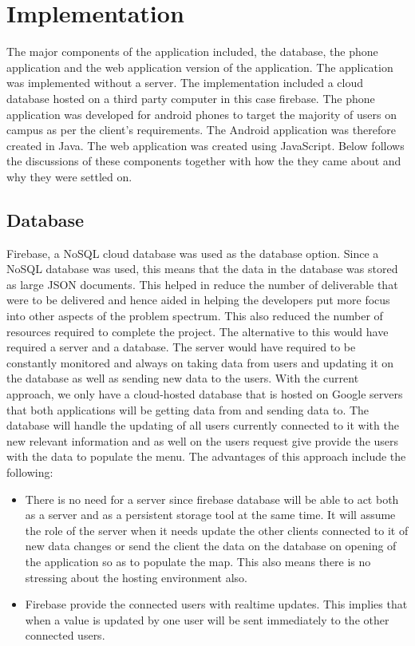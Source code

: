 \newpage
\section{Implementation}
The major components of the application included, the database, the phone application and the web application version of the application. The application was implemented without a server. The implementation included a cloud database hosted on a third party computer in this case firebase. The phone application was developed for android phones to target the majority of users on campus as per the client's requirements. The Android application was therefore created in Java. The web application was created using JavaScript. Below follows the discussions of these components together with how the they came about and why they were settled on.

\subsection*{Database}
Firebase, a NoSQL cloud database was used as the database option. 
Since a NoSQL database was used, this means that the data in the database was stored as large JSON documents. This helped in reduce the number of deliverable that were to be delivered and hence aided in helping the developers put more focus into other aspects of the problem spectrum. This also reduced the number of resources required to complete the project. The alternative to this would have required a server and a database. The server would have required to be constantly monitored and always on taking data from users and updating it on the database as well as sending new data to the users. With the current approach, we only have a cloud-hosted database that is hosted on Google servers that both applications will be getting data from and sending data to. The database will handle the updating of all users currently connected to it with the new relevant information and as well on the users request give provide the users with the data to populate the menu. The advantages of this approach include the following:
\begin{itemize}
	\item There is no need for a server since firebase database will be able to act both as a server and as a persistent storage tool at the same time. It will assume the role of the server when it needs update the other clients connected to it of new data changes or send the client the data on the database on opening of the application so as to populate the map. This also means there is no stressing about the hosting environment also.
	\item Firebase provide the connected users with realtime updates. This implies that when a value is updated by one user will be sent immediately to the other connected users.
\end{itemize}
